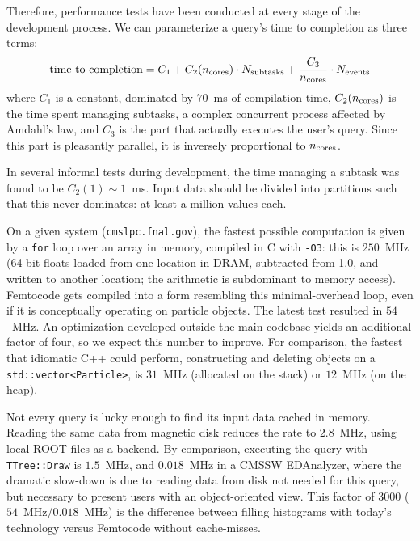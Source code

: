 \documentclass{article}
\begin{document}
Therefore, performance tests have been conducted at every stage of the development process. We can parameterize a query's time to completion as three terms:
\begin{equation}
\mbox{time to completion} = C_1 + C_2(n_{\mbox{\scriptsize cores}}) \cdot N_{\mbox{\scriptsize subtasks}} + \frac{C_3}{n_{\mbox{\scriptsize cores}}} \cdot N_{\mbox{\scriptsize events}}
\end{equation}
where $C_1$ is a constant, dominated by $70$~ms of compilation time, $C_2(n_{\mbox{\scriptsize cores}})$ is the time spent managing subtasks, a complex concurrent process affected by Amdahl's law, and $C_3$ is the part that actually executes the user's query. Since this part is pleasantly parallel, it is inversely proportional to $n_{\mbox{\scriptsize cores}}$.

In several informal tests during development, the time managing a subtask was found to be $C_2(1) \sim 1$~ms. Input data should be divided into partitions such that this never dominates: at least a million values each.

On a given system ({\tt cmslpc.fnal.gov}), the fastest possible computation is given by a {\tt for} loop over an array in memory, compiled in C with {\tt -O3}: this is $250$~MHz (64-bit floats loaded from one location in DRAM, subtracted from 1.0, and written to another location; the arithmetic is subdominant to memory access). Femtocode gets compiled into a form resembling this minimal-overhead loop, even if it is conceptually operating on particle objects. The latest test resulted in $54$~MHz. An optimization developed outside the main codebase yields an additional factor of four, so we expect this number to improve. For comparison, the fastest that idiomatic C++ could perform, constructing and deleting objects on a {\tt std::vector<Particle>}, is $31$~MHz (allocated on the stack) or $12$~MHz (on the heap).

Not every query is lucky enough to find its input data cached in memory. Reading the same data from magnetic disk reduces the rate to $2.8$~MHz, using local ROOT files as a backend. By comparison, executing the query with {\tt TTree::Draw} is $1.5$~MHz, and $0.018$~MHz in a CMSSW EDAnalyzer, where the dramatic slow-down is due to reading data from disk not needed for this query, but necessary to present users with an object-oriented view. This factor of 3000 ($54$~MHz/$0.018$~MHz) is the difference between filling histograms with today's technology versus Femtocode without cache-misses.
\end{document}
